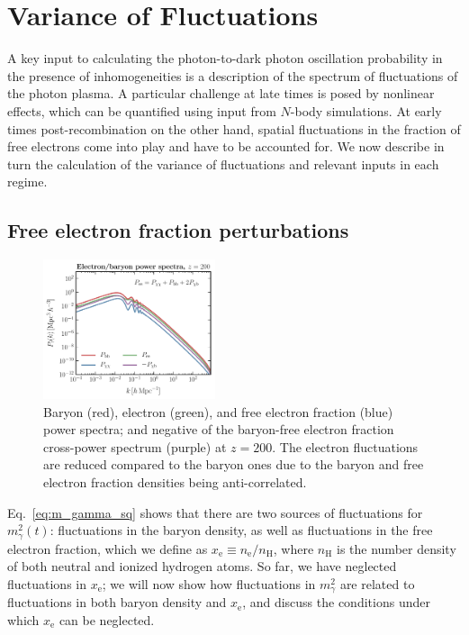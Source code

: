 \documentclass[prd,aps,10pt,nofootinbib,twocolumn,superscriptaddress,preprintnumbers,balancelastpage,longbibliography]{revtex4-1}
\begin{document}
\section{Variance of Fluctuations}
\label{sec:variance_of_fluctuations}

A key input to calculating the photon-to-dark photon oscillation probability in the presence of inhomogeneities is a description of the spectrum of fluctuations of the photon plasma. A particular challenge at late times is posed by nonlinear effects, which can be quantified using input from $N$-body simulations. At early times post-recombination on the other hand, spatial fluctuations in the fraction of free electrons come into play and have to be accounted for. We now describe in turn the calculation of the variance of fluctuations and relevant inputs in each regime.

\subsection{Free electron fraction perturbations}
\label{sec:free_elec_frac_perturb}

%
\begin{figure}[tbp]
    \centering
    \includegraphics[width=0.45\textwidth]{plots/PS_high_z}
    \caption{Baryon (red), electron (green), and free electron fraction (blue) power spectra; and negative of the baryon-free electron fraction cross-power spectrum (purple) at $z=200$. The electron fluctuations are reduced compared to the baryon ones due to the baryon and free electron fraction densities being anti-correlated.~} 
    \label{fig:pspecs_high_z}
\end{figure}
%

Eq.~\eqref{eq:m_gamma_sq} shows that there are two sources of fluctuations for $m_\gamma^2(t)$: fluctuations in the baryon density, as well as fluctuations in the free electron fraction, which we define as $x_\text{e} \equiv n_\text{e}/n_\text{H}$, where $n_\text{H}$ is the number density of both neutral and ionized hydrogen atoms. 
So far, we have neglected fluctuations in $x_\text{e}$; we will now show how fluctuations in $m_\gamma^2$ are related to fluctuations in both baryon density and $x_\text{e}$, and discuss the conditions under which $x_\text{e}$ can be neglected.
\end{document}

